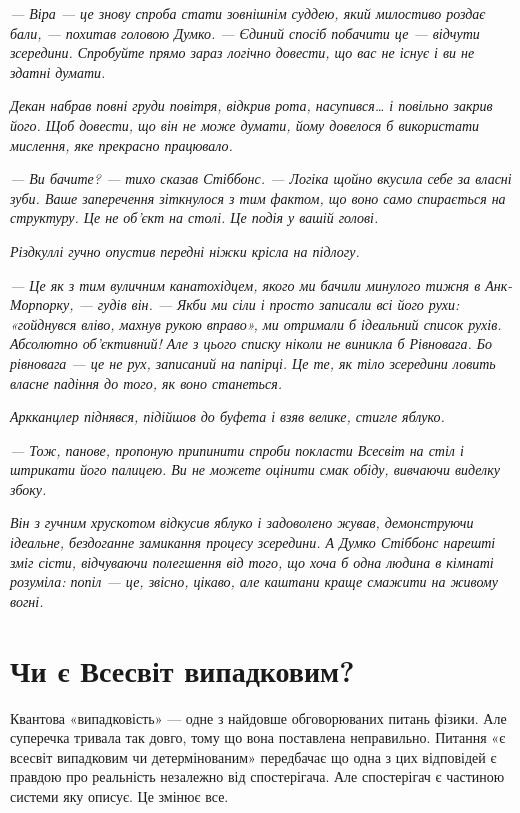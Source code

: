 \documentclass[12pt, a4paper, openany]{book}
\begin{document}
\begin{terrybox}
\textit{--- Віра --- це знову спроба стати зовнішнім суддею, який милостиво роздає бали, --- похитав головою Думко. --- Єдиний спосіб побачити це --- відчути зсередини. Спробуйте прямо зараз логічно довести, що вас не існує і ви не здатні думати.}

\textit{Декан набрав повні груди повітря, відкрив рота, насупився\ldots{} і повільно закрив його. Щоб довести, що він не може думати, йому довелося б використати мислення, яке прекрасно працювало.}

\textit{--- Ви бачите? --- тихо сказав Стіббонс. --- Логіка щойно вкусила себе за власні зуби. Ваше заперечення зіткнулося з тим фактом, що воно само спирається на структуру. Це не об'єкт на столі. Це подія у вашій голові.}

\textit{Різдкуллі гучно опустив передні ніжки крісла на підлогу.}

\textit{--- Це як з тим вуличним канатохідцем, якого ми бачили минулого тижня в Анк-Морпорку, --- гудів він. --- Якби ми сіли і просто записали всі його рухи: «гойднувся вліво, махнув рукою вправо», ми отримали б ідеальний список рухів. Абсолютно об'єктивний! Але з цього списку ніколи не виникла б Рівновага. Бо рівновага --- це не рух, записаний на папірці. Це те, як тіло зсередини ловить власне падіння до того, як воно станеться.}

\textit{Аркканцлер піднявся, підійшов до буфета і взяв велике, стигле яблуко.}

\textit{--- Тож, панове, пропоную припинити спроби покласти Всесвіт на стіл і штрикати його палицею. Ви не можете оцінити смак обіду, вивчаючи виделку збоку.}

\textit{Він з гучним хрускотом відкусив яблуко і задоволено жував, демонструючи ідеальне, бездоганне замикання процесу зсередини. А Думко Стіббонс нарешті зміг сісти, відчуваючи полегшення від того, що хоча б одна людина в кімнаті розуміла: попіл --- це, звісно, цікаво, але каштани краще смажити на живому вогні.}
\end{terrybox}


\chapter{Чи є Всесвіт випадковим?}

Квантова «випадковість» — одне з найдовше обговорюваних питань фізики. Але суперечка тривала так довго, тому що вона поставлена неправильно. Питання «є всесвіт випадковим чи детермінованим» передбачає що одна з цих відповідей є правдою про реальність незалежно від спостерігача. Але спостерігач є частиною системи яку описує. Це змінює все.
\end{document}

